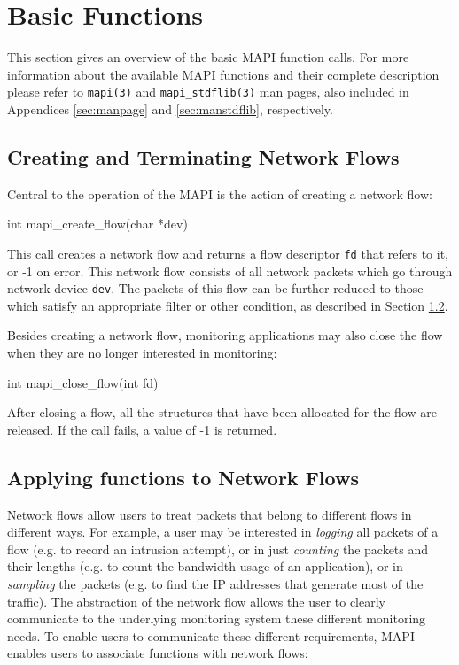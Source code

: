 \documentclass[a4paper, 11pt]{article}
\newenvironment{code}{\small\verbatim}{\endverbatim}
\begin{document}
\section{Basic Functions}

This section gives an overview of the basic MAPI function calls.
For more information about the available MAPI functions
and their complete description please refer to
{\tt mapi(3)} and {\tt mapi\_stdflib(3)} man pages, also included in
Appendices \ref{sec:manpage} and \ref{sec:manstdflib}, respectively.

\subsection{Creating and Terminating Network Flows}

Central to the operation of the MAPI  
is the action of creating  a network  flow:

\begin{code}  
int mapi_create_flow(char *dev)
\end{code}

This call creates a network flow and returns a flow 
descriptor {\tt fd} that refers to it, or -1 on error.
This  network flow consists of all network packets which 
go through network device {\tt dev}.
The packets of this flow can be further reduced to those which satisfy an appropriate
filter or other condition, as described in Section \ref{apply-functs}.

Besides creating a network flow, monitoring applications may
also close the flow when they are no longer interested in
monitoring:

\begin{code}  
int mapi_close_flow(int fd)
\end{code}  

After closing a flow, all the structures that have been allocated for the flow are released.
If the call fails, a value of -1 is returned.

\subsection{Applying functions to Network Flows}
\label{apply-functs}

Network flows allow users to treat packets
that belong to different flows in different ways.
For example, a user may be interested in {\em logging}
all packets of a flow (e.g. to record an intrusion attempt),
or in just {\em counting} the packets and their lengths
(e.g. to count the bandwidth usage of an application),
or in {\em sampling} the packets
(e.g. to find the IP addresses that generate most of the traffic).
The abstraction of the network flow
allows the user to clearly communicate to the underlying monitoring system
these different monitoring needs.
To enable users to communicate these different
requirements, MAPI enables users to
associate functions with network flows:
\end{document}
